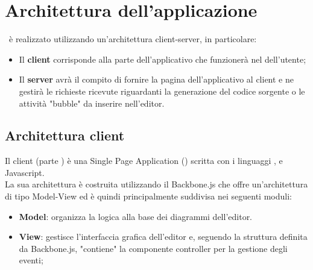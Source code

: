 \documentclass[../DefinizioneDiProdotto.tex]{subfiles}
\begin{document}
		\section{Architettura dell'applicazione}
			\progetto\ è realizzato utilizzando un'architettura client-server, in particolare:
			\begin{itemize}
				\item Il \textbf{client} corrisponde alla parte dell'applicativo che funzionerà nel
				 dell'utente;
				\item Il \textbf{server} avrà il compito di fornire la pagina dell'applicativo al client
				e ne gestirà le richieste ricevute riguardanti la generazione del codice sorgente o le
				attività "bubble" da inserire nell'editor.
			\end{itemize}
			\subsection{Architettura client}
				Il client (parte ) è una Single Page Application () scritta con i linguaggi
				,  e Javascript.\\
				La sua architettura è costruita utilizzando il  Backbone.js che offre
				un'architettura di tipo Model-View ed è quindi principalmente suddivisa nei seguenti moduli:
				\begin{itemize}
					\item \textbf{Model}: organizza la logica alla base dei diagrammi dell'editor.
					\item \textbf{View}: gestisce l'interfaccia grafica dell'editor e, seguendo la struttura
					definita da Backbone.js, "contiene" la componente controller per la gestione
					degli eventi; 
				\end{itemize}
\end{document}
